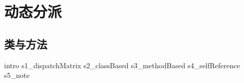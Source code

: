 \part{动态分派}
\chapter{类与方法}

{intro}
{s1_dispatchMatrix}
{s2_classBased}
{s3_methodBased}
{s4_selfReference}
{s5_note}

